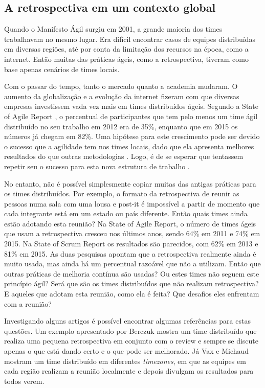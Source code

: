 \documentclass[12pt]{article}
\begin{document}
\subsection{A retrospectiva em um contexto global}

Quando o Manifesto Ágil \cite{manifesto:01} surgiu em 2001, a grande maioria dos times trabalhavam no mesmo lugar. Era difícil encontrar casos de equipes distribuídas em diversas regiões, até por conta da limitação dos recursos na época, como a internet. Então muitas das práticas ágeis, como a retrospectiva,  tiveram como base apenas cenários de times locais.
  
Com o passar do tempo, tanto o mercado quanto a academia mudaram. O aumento da globalização e a evolução da internet fizeram com que diversas empresas investissem vada vez mais em times distribuídos ágeis. Segundo a State of Agile Report \cite{version:12}\cite{version:15}, o percentual de participantes que tem pelo menos um time ágil distribuído no seu trabalho em 2012 era de 35\%, enquanto que em 2015 os números já chegam em 82\%. Uma hipótese para este crescimento pode ser devido o sucesso que a agilidade tem nos times locais, dado que ela apresenta melhores resultados do que outras metodologias \cite{chaos:15}. Logo, é de se esperar que tentassem repetir seu o sucesso para esta nova estrutura de trabalho \cite{gsd:09}.

No entanto, não é possível simplesmente copiar muitas das antigas práticas para os times distribuídos. Por exemplo, o formato da retrospectiva de reunir as pessoas numa sala com uma lousa e post-it é impossível a partir de momento que cada integrante está em um estado ou país diferente. Então quais times ainda estão adotando esta reunião? Na State of Agile Report, o número de times ágeis que usam a retrospectiva cresceu nos últimos anos, sendo 64\% em 2011 e 74\% em 2015. Na State of Scrum Report \cite{scrum:13}\cite{scrum:15} os resultados são parecidos, com 62\% em 2013 e 81\% em 2015. As duas pesquisas apontam que a retrospectiva realmente ainda é muito usada, mas ainda há um percentual razoável que não a utilizam. Então que outras práticas de melhoria contínua são usadas? Ou estes times não seguem este princípio ágil? Será que são os times distribuídos que não realizam retrospectiva? E aqueles que adotam esta reunião, como ela é feita? Que desafios eles enfrentam com a reunião?

Investigando alguns artigos é possível encontrar algumas referências para estas questões. Um exemplo apresentado por Berczuk \cite{berczuk:07} mostra um time distribuído que realiza uma pequena retrospectiva em conjunto com o review e sempre se discute apenas o que está dando certo e o que pode ser melhorado. Já Vax e Michaud \cite{vax:08} mostram um time distribuído em diferentes \textit{timezones}, em que as equipes em cada região realizam a reunião localmente e depois divulgam os resultados para todos verem.
\end{document}
